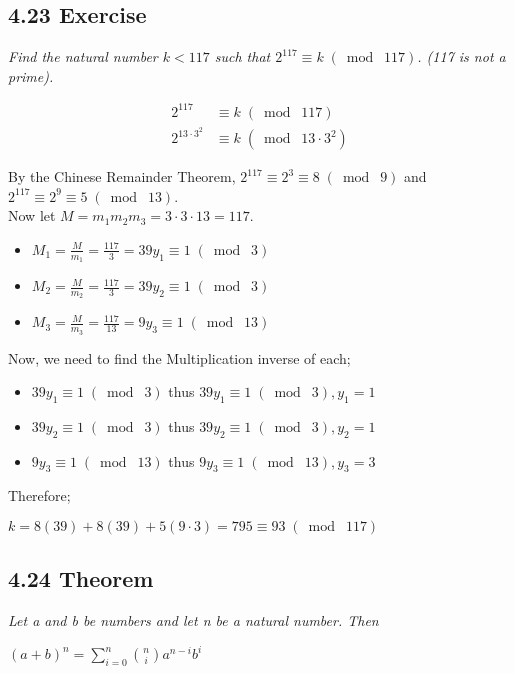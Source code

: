 \documentclass{article}
\begin{document}
\subsection*{4.23 Exercise} 
\quad \textit{Find the natural number $k < 117$ such that $2^{117} \equiv k \;(\bmod\; 117)$. (117 is not a prime).}

\begin{align*}
    && 2^{117} &\equiv k \;(\bmod\; 117) &&\\
    && 2^{13 \cdot 3^2} &\equiv k \;(\bmod\; 13 \cdot 3^2) &&
\end{align*}

By the Chinese Remainder Theorem, $2^{117} \equiv 2^3 \equiv 8 \;(\bmod\; 9)$ and $2^{117} \equiv 2^9 \equiv 5 \;(\bmod\; 13)$.\\
Now let $M = m_1m_2m_3 = 3 \cdot 3 \cdot 13 = 117$.\\
\begin{itemize}
    \item $M_1 = \frac{M}{m_1} = \frac{117}{3} = 39y_1 \equiv 1 \;(\bmod\; 3)$
    \item $M_2 = \frac{M}{m_2} = \frac{117}{3} = 39y_2 \equiv 1 \;(\bmod\; 3)$
    \item $M_3 = \frac{M}{m_3} = \frac{117}{13} = 9y_3 \equiv 1 \;(\bmod\; 13)$
\end{itemize}

Now, we need to find the Multiplication inverse of each;
\begin{itemize}
    \item $39y_1 \equiv 1 \;(\bmod\; 3)$ thus $39y_1 \equiv 1 \;(\bmod\; 3), y_1 = 1$
    \item $39y_2 \equiv 1 \;(\bmod\; 3)$ thus $39y_2 \equiv 1 \;(\bmod\; 3), y_2 = 1$
    \item $9y_3 \equiv 1 \;(\bmod\; 13)$ thus $9y_3 \equiv 1 \;(\bmod\; 13), y_3 = 3$
\end{itemize}

Therefore;
\begin{center}
    $k = 8(39) + 8(39) + 5(9\cdot 3) = 795 \equiv 93 \;(\bmod\; 117)$
\end{center}

\subsection*{4.24 Theorem} 
\quad \textit{Let a and b be numbers and let n be a natural number. Then}
\begin{center}
    $(a+b)^n = \sum_{i = 0}^{n} \binom{n}{i} a^{n-i}b^i$
\end{center}
\end{document}
